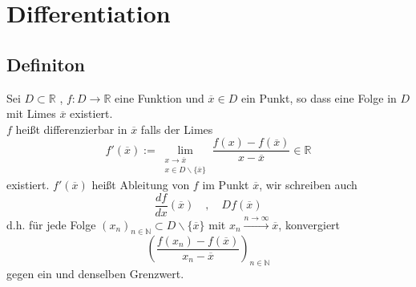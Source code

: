 \section{Differentiation} %
\label{sec:differentiation}

\subsection{Definiton} %
\label{sub:definiton}
Sei $D \subset \mathds{R}$ , $f : D \to \mathds{R}$ eine Funktion und $\overline{x} \in D$ ein Punkt, so dass eine Folge in $D$ mit Limes $\overline{x}$ existiert.\\
$f$ heißt differenzierbar in $\overline{x}$ falls der Limes 
\[
	f'(\overline{x}) := \lim\limits_{\substack{x \to \overline{x} \\ x \in D \backslash \{\overline{x} \} }} \frac{f(x)- f(\overline{x})}{x- \overline{x}} \in \mathds{R}
\]
existiert. $f'(\overline{x})$ heißt Ableitung von $f$ im Punkt $\overline{x}$, wir schreiben auch 
\[
	\frac{df}{dx}(\overline{x}) \quad , \quad Df(\overline{x}) 
\]
d.h. für jede Folge $(x_n)_{n \in \mathds{N}} \subset D \backslash \{ \overline{x} \}$ mit $x_n \xrightarrow{n \to \infty} \overline{x}$, konvergiert
\[
	\left(  \frac{ f(x_n)- f(\overline{x}) }{x_n - \overline{x}} \right)_{n \in \mathds{N}}
\] 
gegen ein und denselben Grenzwert.

